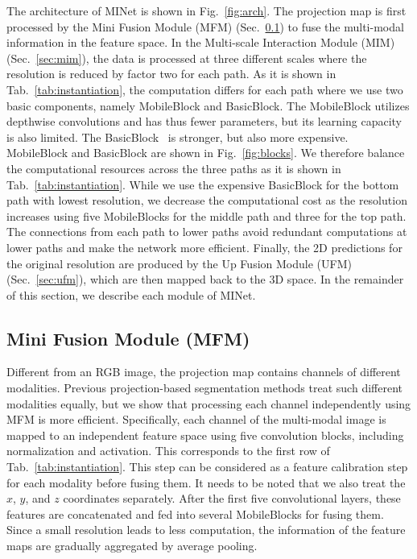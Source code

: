 \documentclass[letterpaper, 10 pt, journal, twoside]{ieeetran}
\newcommand{\figref}[1]{Fig.~\ref{#1}}
\newcommand{\tabref}[1]{Tab.~\ref{#1}}
\newcommand{\secref}[1]{Sec.~\ref{#1}}
\begin{document}
The architecture of MINet is shown in \figref{fig:arch}. The projection map is first processed by the Mini Fusion Module (MFM) (\secref{sec:mfm}) to fuse the multi-modal information in the feature space. 
In the Multi-scale Interaction Module (MIM) (\secref{sec:mim}), the data is processed at three different scales where the resolution is reduced by factor two for each path. 
As it is shown in \tabref{tab:instantiation}, the computation differs for each path where we use two basic components, namely MobileBlock and BasicBlock. 
The MobileBlock \cite{howard2017mobilenets, sandler2018mobilenetv2} utilizes depthwise convolutions and has thus fewer parameters, but its learning capacity is also limited. 
The BasicBlock~\cite{he2016deep} is stronger, but also more expensive. 
MobileBlock and BasicBlock are shown in \figref{fig:blocks}. 
We therefore balance the computational resources across the three paths as it is shown in \tabref{tab:instantiation}. 
While we use the expensive BasicBlock for the bottom path with lowest resolution, we decrease the computational cost as the resolution increases using five MobileBlocks for the middle path and three for the top path. 
The connections from each path to lower paths avoid redundant computations at lower paths and make the network more efficient. 
Finally, the 2D predictions for the original resolution are produced by the Up Fusion Module (UFM) (\secref{sec:ufm}), which are then mapped back to the 3D space. 
In the remainder of this section, we describe each module of MINet.


\subsection{Mini Fusion Module (MFM)} \label{sec:mfm}
Different from an RGB image, the projection map contains channels of different modalities. 
Previous projection-based segmentation methods \cite{wu2018squeezeseg,wu2019squeezesegv2,milioto2019rangenet++} treat such different modalities equally, but we show that processing each channel independently using MFM is more efficient.
Specifically, each channel of the multi-modal image is mapped to an independent feature space using five convolution blocks, including normalization and activation. 
This corresponds to the first row of \tabref{tab:instantiation}. 
This step can be considered as a feature calibration step for each modality before fusing them. 
It needs to be noted that we also treat the $x$, $y$, and $z$ coordinates separately. 
After the first five convolutional layers, these features are concatenated and fed into several MobileBlocks for fusing them. 
Since a small resolution leads to less computation, the information of the feature maps are gradually aggregated by average pooling.
\end{document}
